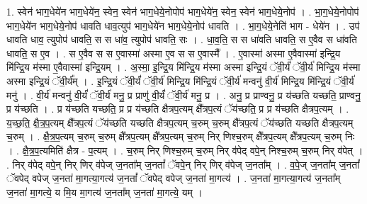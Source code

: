 \documentclass[17pt]{extarticle}
\begin{document}
1. स्वेन॑ भाग॒धेये॑न भाग॒धेये॑न॒ स्वेन॒ स्वेन॑ भाग॒धेये॒नोपोप॑ भाग॒धेये॑न॒ स्वेन॒ स्वेन॑ भाग॒धेये॒नोप॑ । . भा॒ग॒धेये॒नोपोप॑ भाग॒धेये॑न भाग॒धेये॒नोप॑ धावति धाव॒त्युप॑ भाग॒धेये॑न भाग॒धेये॒नोप॑ धावति । . भा॒ग॒धेये॒नेति॑ भाग - धेये॑न । . उप॑ धावति धाव॒ त्युपोप॑ धावति॒ स स धा॑व॒ त्युपोप॑ धावति॒ सः । . धा॒व॒ति॒ स स धा॑वति धावति॒ स ए॒वैव स धा॑वति धावति॒ स ए॒व । . स ए॒वैव स स ए॒वास्मा॑ अस्मा ए॒व स स ए॒वास्मै᳚ । . ए॒वास्मा॑ अस्मा ए॒वैवास्मा॑ इन्द्रि॒य मि॑न्द्रि॒य म॑स्मा ए॒वैवास्मा॑ इन्द्रि॒यम् । . अ॒स्मा॒ इ॒न्द्रि॒य मि॑न्द्रि॒य म॑स्मा अस्मा इन्द्रि॒यं ॅवी॒र्यं॑ ॅवी॒र्य॑ मिन्द्रि॒य म॑स्मा अस्मा इन्द्रि॒यं ॅवी॒र्य᳚म् । . इ॒न्द्रि॒यं ॅवी॒र्यं॑ ॅवी॒र्य॑ मिन्द्रि॒य मि॑न्द्रि॒यं ॅवी॒र्य॑ मन्वनु॑ वी॒र्य॑ मिन्द्रि॒य मि॑न्द्रि॒यं ॅवी॒र्य॑ मनु॑ । . वी॒र्य॑ मन्वनु॑ वी॒र्यं॑ ॅवी॒र्य॑ मनु॒ प्र प्राणु॑ वी॒र्यं॑ ॅवी॒र्य॑ मनु॒ प्र । . अनु॒ प्र प्राण्वनु॒ प्र य॑च्छति यच्छति॒ प्राण्वनु॒ प्र य॑च्छति । . प्र य॑च्छति यच्छति॒ प्र प्र य॑च्छति क्षैत्रप॒त्यम् क्षै᳚त्रप॒त्यं ॅय॑च्छति॒ प्र प्र य॑च्छति क्षैत्रप॒त्यम् । . य॒च्छ॒ति॒ क्षै॒त्र॒प॒त्यम् क्षै᳚त्रप॒त्यं ॅय॑च्छति यच्छति क्षैत्रप॒त्यम् च॒रुम् च॒रुम् क्षै᳚त्रप॒त्यं ॅय॑च्छति यच्छति क्षैत्रप॒त्यम् च॒रुम् । . क्षै॒त्र॒प॒त्यम् च॒रुम् च॒रुम् क्षै᳚त्रप॒त्यम् क्षै᳚त्रप॒त्यम् च॒रुम् निर् णिश्च॒रुम् क्षै᳚त्रप॒त्यम् क्षै᳚त्रप॒त्यम् च॒रुम् निः । . क्षै॒त्र॒प॒त्यमिति॑ क्षैत्र - प॒त्यम् । . च॒रुम् निर् णिश्च॒रुम् च॒रुम् निर् व॑पेद् वपे॒न् निश्च॒रुम् च॒रुम् निर् व॑पेत् । . निर् व॑पेद् वपे॒न् निर् णिर् व॑पेज् ज॒नता᳚म् ज॒नतां᳚ ॅवपे॒न् निर् णिर् व॑पेज् ज॒नता᳚म् । . व॒पे॒ज् ज॒नता᳚म् ज॒नतां᳚ ॅवपेद् वपेज् ज॒नता॑ मा॒गत्या॒गत्य॑ ज॒नतां᳚ ॅवपेद् वपेज् ज॒नता॑ मा॒गत्य॑ । . ज॒नता॑ मा॒गत्या॒गत्य॑ ज॒नता᳚म् ज॒नता॑ मा॒गत्ये॒ य मि॒य मा॒गत्य॑ ज॒नता᳚म् ज॒नता॑ मा॒गत्ये॒ यम् । \newline
\end{document}
